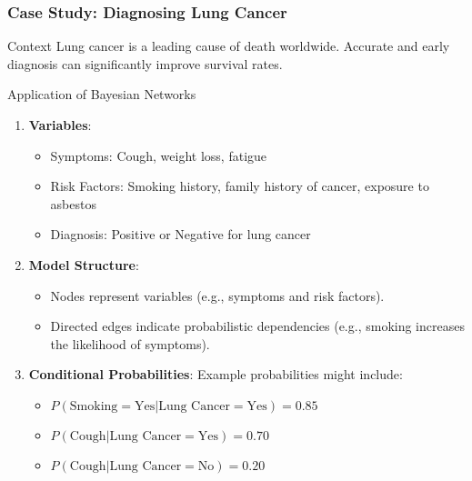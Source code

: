 \documentclass[aspectratio=169]{beamer}
\begin{document}
\begin{frame}[fragile]
    \frametitle{Case Study: Diagnosing Lung Cancer}
    \begin{block}{Context}
        Lung cancer is a leading cause of death worldwide. Accurate and early diagnosis can significantly improve survival rates.
    \end{block}

    \begin{block}{Application of Bayesian Networks}
        \begin{enumerate}
            \item \textbf{Variables}:
                \begin{itemize}
                    \item Symptoms: Cough, weight loss, fatigue
                    \item Risk Factors: Smoking history, family history of cancer, exposure to asbestos
                    \item Diagnosis: Positive or Negative for lung cancer
                \end{itemize}
            \item \textbf{Model Structure}:
                \begin{itemize}
                    \item Nodes represent variables (e.g., symptoms and risk factors).
                    \item Directed edges indicate probabilistic dependencies (e.g., smoking increases the likelihood of symptoms).
                \end{itemize}
            \item \textbf{Conditional Probabilities}:
                Example probabilities might include:
                \begin{itemize}
                    \item $P(\text{Smoking} = \text{Yes} | \text{Lung Cancer} = \text{Yes}) = 0.85$
                    \item $P(\text{Cough} | \text{Lung Cancer} = \text{Yes}) = 0.70$
                    \item $P(\text{Cough} | \text{Lung Cancer} = \text{No}) = 0.20$
                \end{itemize}
        \end{enumerate}
    \end{block}
\end{frame}
\end{document}
